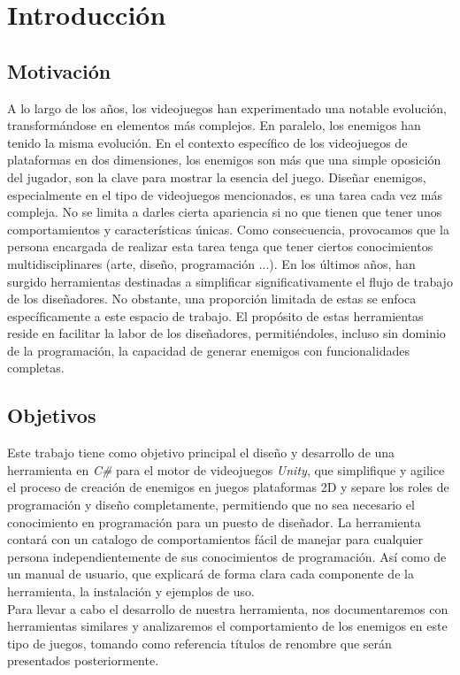 \chapter{Introducción}
\label{cap:introduccion}


\section{Motivación}
A lo largo de los años, los videojuegos han experimentado una notable evolución, transformándose en elementos más complejos. En paralelo, los enemigos han tenido la misma evolución. En el contexto específico de los videojuegos de plataformas en dos dimensiones, los enemigos son más que una simple oposición del jugador, son la clave para mostrar la esencia del juego. Diseñar enemigos, especialmente en el tipo de videojuegos mencionados, es una tarea cada vez más compleja. No se limita a darles cierta apariencia si no que tienen que tener unos comportamientos y características únicas. Como consecuencia, provocamos que la persona encargada de realizar esta tarea tenga que tener ciertos conocimientos multidisciplinares (arte, diseño, programación ...). 
En los últimos años, han surgido herramientas destinadas a simplificar significativamente el flujo de trabajo de los diseñadores. No obstante, una proporción limitada de estas se enfoca específicamente a este espacio de trabajo. El propósito de estas herramientas reside en facilitar la labor de los diseñadores, permitiéndoles, incluso sin dominio de la programación, la capacidad de generar enemigos con funcionalidades completas.

\section{Objetivos}
Este trabajo tiene como objetivo principal el diseño y desarrollo de una herramienta en  \textit{C\#} para el motor de videojuegos \textit{Unity}, que simplifique y agilice el proceso de creación de enemigos en juegos plataformas 2D y separe los roles de programación y diseño completamente, permitiendo que no sea necesario el conocimiento en programación para un puesto de diseñador.
La herramienta contará con un catalogo de comportamientos fácil de manejar para cualquier persona independientemente de sus conocimientos de programación. Así como de un manual de usuario, que explicará de forma clara cada componente de la herramienta, la instalación y ejemplos de uso. \\
Para llevar a cabo el desarrollo de nuestra herramienta, nos documentaremos con herramientas similares y analizaremos el comportamiento de los enemigos en este tipo de juegos, tomando como referencia títulos de renombre que serán presentados posteriormente.


